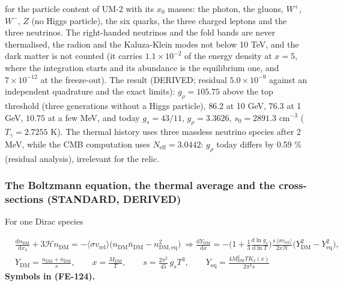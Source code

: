 \documentclass[
  10pt,
]{article}
\begin{document}
for the particle content of UM-2 with its \(x_0\) masses: the photon,
the gluons, \(W^+\), \(W^-\), \(Z\) (no Higgs particle), the six quarks,
the three charged leptons and the three neutrinos. The right-handed
neutrinos and the fold bands are never thermalised, the radion and the
Kaluza-Klein modes not below 10 TeV, and the dark matter is not counted
(it carries \(1.1\times10^{-2}\) of the energy density at \(x = 5\),
where the integration starts and its abundance is the equilibrium one,
and \(7\times10^{-12}\) at the freeze-out). The result (DERIVED;
residual \(5.0\times10^{-9}\) against an independent quadrature and the
exact limits): \(g_\rho = 105.75\) above the top threshold (three
generations without a Higgs particle), \(86.2\) at 10 GeV, \(76.3\) at 1
GeV, \(10.75\) at a few MeV, and today \(g_s = 43/11\),
\(g_\rho = 3.3626\), \(s_0 = 2891.3\) cm\(^{-3}\) (\(T_\gamma = 2.7255\)
K). The thermal history uses three massless neutrino species after 2
MeV, while the CMB computation uses \(N_{\mathrm{eff}} = 3.0442\):
\(g_\rho\) today differs by 0.59 \% (residual analysis), irrelevant for
the relic.

\hypertarget{the-boltzmann-equation-the-thermal-average-and-the-cross-sections-standard-derived}{%
\subsubsection*{The Boltzmann equation, the thermal average and the
cross-sections (STANDARD,
DERIVED)}\label{the-boltzmann-equation-the-thermal-average-and-the-cross-sections-standard-derived}}

For one Dirac species

\[
\begin{aligned}
&\frac{\mathrm{d}n_{\mathrm{DM}}}{\mathrm{d}x_4} + 3\mathcal{H}n_{\mathrm{DM}}
 = -\langle\sigma v_{\mathrm{rel}}\rangle\big(n_{\mathrm{DM}}\bar n_{\mathrm{DM}} -
 n_{\mathrm{DM,eq}}^2\big)\ \Rightarrow
 \frac{\mathrm{d}Y_{\mathrm{DM}}}{\mathrm{d}x} = -\Big(1 + \frac13\frac{\mathrm{d}\ln g_s}{\mathrm{d}\ln
 T}\Big)
 \frac{s\,\langle\sigma v_{\mathrm{rel}}\rangle}{2x\mathcal{H}}\big(Y_{\mathrm{DM}}^2 -
 Y_{\mathrm{eq}}^2\big),\\
&Y_{\mathrm{DM}} = \frac{n_{\mathrm{DM}} + \bar n_{\mathrm{DM}}}{s},\qquad x =
 \frac{M_{\mathrm{DM}}}{T},\qquad
 s = \frac{2\pi^2}{45}\,g_sT^3,\qquad Y_{\mathrm{eq}} = \frac{4M_{\mathrm{DM}}^2TK_2(x)}{2\pi^2s}
\end{aligned} \tag{FE-124}
\] \textbf{Symbols in (FE-124).}
\end{document}
